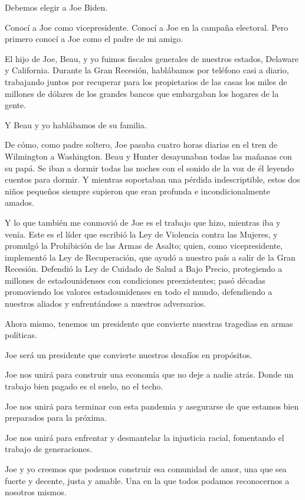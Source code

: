 Debemos elegir a Joe Biden.

Conocí a Joe como vicepresidente. Conocí a Joe en la campaña electoral.
Pero primero conocí a Joe como el padre de mi amigo.

El hijo de Joe, Beau, y yo fuimos fiscales generales de nuestros
estados, Delaware y California. Durante la Gran Recesión, hablábamos por
teléfono casi a diario, trabajando juntos por recuperar para los
propietarios de las casas los miles de millones de dólares de los
grandes bancos que embargaban los hogares de la gente.

Y Beau y yo hablábamos de su familia.

De cómo, como padre soltero, Joe pasaba cuatro horas diarias en el tren
de Wilmington a Washington. Beau y Hunter desayunaban todas las mañanas
con su papá. Se iban a dormir todas las noches con el sonido de la voz
de él leyendo cuentos para dormir. Y mientras soportaban una pérdida
indescriptible, estos dos niños pequeños siempre supieron que eran
profunda e incondicionalmente amados.

Y lo que también me conmovió de Joe es el trabajo que hizo, mientras iba
y venía. Este es el líder que escribió la Ley de Violencia contra las
Mujeres, y promulgó la Prohibición de las Armas de Asalto; quien, como
vicepresidente, implementó la Ley de Recuperación, que ayudó a nuestro
país a salir de la Gran Recesión. Defendió la Ley de Cuidado de Salud a
Bajo Precio, protegiendo a millones de estadounidenses con condiciones
preexistentes; pasó décadas promoviendo los valores estadounidenses en
todo el mundo, defendiendo a nuestros aliados y enfrentándose a nuestros
adversarios.

Ahora mismo, tenemos un presidente que convierte nuestras tragedias en
armas políticas.

Joe será un presidente que convierte nuestros desafíos en propósitos.

Joe nos unirá para construir una economía que no deje a nadie atrás.
Donde un trabajo bien pagado es el suelo, no el techo.

Joe nos unirá para terminar con esta pandemia y asegurarse de que
estamos bien preparados para la próxima.

Joe nos unirá para enfrentar y desmantelar la injusticia racial,
fomentando el trabajo de generaciones.

Joe y yo creemos que podemos construir esa comunidad de amor, una que
sea fuerte y decente, justa y amable. Una en la que todos podamos
reconocernos a nosotros mismos.

